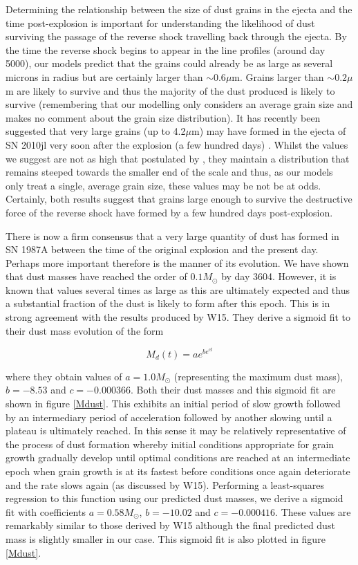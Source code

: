 \documentclass[useAMS,usenatbib,usegraphicx]{mnras}
\begin{document}
Determining the relationship between the size of dust grains in the ejecta 
and the time post-explosion is important for understanding the likelihood 
of dust surviving the passage of the reverse shock travelling back through 
the ejecta. By the time the reverse shock begins to appear in the line 
profiles (around day 5000), our models predict that the grains could 
already be as large as several microns in radius but are certainly larger 
than $\sim 0.6\mu$m.  Grains larger than $\sim 0.2\mu$m are likely to 
survive and thus the majority of the dust produced is likely to survive 
(remembering that our modelling only considers an average grain size and 
makes no comment about the grain size distribution).  It has recently been 
suggested that very large grains (up to 4.2$\mu$m) may have formed in the 
ejecta of SN 2010jl very soon after the explosion (a few hundred days) 
\cite{Gall2014}.  Whilst the values we suggest are not as high that 
postulated by \citet{Gall2014}, they maintain a distribution that remains 
steeped towards the smaller end of the scale and thus, as our models only 
treat a single, average grain size, these values may be not be at odds.  
Certainly, both results suggest that grains large enough to survive the 
destructive force of the reverse shock have formed by a few hundred days 
post-explosion.

There is now a firm consensus that a very large quantity of dust has 
formed in SN 1987A between the time of the original explosion and the 
present day.  Perhaps more important therefore is the manner of its 
evolution.  We have shown that dust masses have reached the order of 
$0.1M_{\odot}$ by day 3604.  However, it is known that values several 
times as large as this are ultimately expected and thus a substantial 
fraction of the dust is likely to form after this epoch.  This is in 
strong agreement with the results produced by W15.  They derive a sigmoid 
fit to their dust mass evolution of the form

\[
M_d(t)=ae^{be^{ct}}
\]
 
where they obtain values of $a=1.0M_{\odot}$ (representing the maximum 
dust mass), $b=-8.53$ and $c=-0.000366$.  Both their dust masses and this 
sigmoid fit are shown in figure \ref{Mdust}.  This exhibits an initial 
period of slow growth followed by an intermediary period of acceleration 
followed by another slowing until a plateau is ultimately reached.  In 
this sense it may be relatively representative of the process of dust 
formation whereby initial conditions appropriate for grain growth 
gradually develop until optimal conditions are reached at an intermediate 
epoch when grain growth is at its fastest before conditions once again 
deteriorate and the rate slows again (as discussed by W15).  Performing a 
least-squares regression to this function using our predicted dust masses, 
we derive a sigmoid fit with coefficients $a=0.58M_{\odot}$, $b=-10.02$ 
and $c=-0.000416$.  These values are remarkably similar to those derived 
by W15 although the final predicted dust mass is slightly smaller in our 
case.  This sigmoid fit is also plotted in figure \ref{Mdust}.
\end{document}

